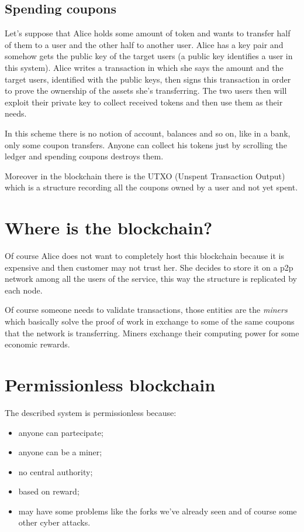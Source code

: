 \subsection{Spending coupons}
Let's suppose that Alice holds some amount of token and wants to transfer half of them to a user and the other half to another user.
Alice has a key pair and somehow gets the public key of the target users (a public key identifies a user in this system).
Alice writes a transaction in which she says the amount and the target users, identified with the public keys, then signs this transaction in order to prove the ownership of the assets she's transferring.
The two users then will exploit their private key to collect received tokens and then use them as their needs.

In this scheme there is no notion of account, balances and so on, like in a bank, only some coupon transfers.
Anyone can collect his tokens just by scrolling the ledger and spending coupons destroys them.

Moreover in the blockchain there is the UTXO (Unspent Transaction Output) which is a structure recording all the coupons owned by a user and not yet spent.

\section{Where is the blockchain?}
Of course Alice does not want to completely host this blockchain because it is expensive and then customer may not trust her.
She decides to store it on a p2p network among all the users of the service, this way the structure is replicated by each node.

Of course someone needs to validate transactions, those entities are the \emph{miners} which basically solve the proof of work in exchange to some of the same coupons that the network is transferring.
Miners exchange their computing power for some economic rewards.

\section{Permissionless blockchain}
The described system is permissionless because:
\begin{itemize}
    \item anyone can partecipate;
    \item anyone can be a miner;
    \item no central authority;
    \item based on reward;
    \item may have some problems like the forks we've already seen and of course some other cyber attacks.
\end{itemize}

